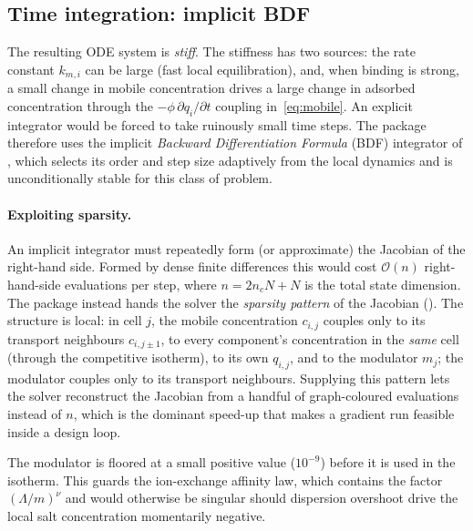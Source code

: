 \subsection{Time integration: implicit BDF}

The resulting ODE system is \emph{stiff}. The stiffness has two sources: the
rate constant $k_{m,i}$ can be large (fast local equilibration), and, when
binding is strong, a small change in mobile concentration drives a large change
in adsorbed concentration through the $-\phi\,\partial q_i/\partial t$ coupling
in~\eqref{eq:mobile}. An explicit integrator would be forced to take
ruinously small time steps. The package therefore uses the implicit
\emph{Backward Differentiation Formula} (BDF) integrator of
, which selects its order and step size
adaptively from the local dynamics and is unconditionally stable for this class
of problem.

\paragraph{Exploiting sparsity.}
An implicit integrator must repeatedly form (or approximate) the Jacobian of the
right-hand side. Formed by dense finite differences this would cost $\mathcal
O(n)$ right-hand-side evaluations per step, where $n = 2 n_c N + N$ is the total
state dimension. The package instead hands the solver the \emph{sparsity
pattern} of the Jacobian (). The structure is local:
in cell $j$, the mobile concentration $c_{i,j}$ couples only to its transport
neighbours $c_{i,j\pm1}$, to every component's concentration in the
\emph{same} cell (through the competitive isotherm), to its own $q_{i,j}$, and to
the modulator $m_j$; the modulator couples only to its transport neighbours.
Supplying this pattern lets the solver reconstruct the Jacobian from a handful of
graph-coloured evaluations instead of $n$, which is the dominant speed-up that
makes a gradient run feasible inside a design loop.

\begin{remark}
The modulator is floored at a small positive value ($10^{-9}$) before it is used
in the isotherm. This guards the ion-exchange affinity law, which contains the
factor $(\Lambda/m)^{\nu}$ and would otherwise be singular should dispersion
overshoot drive the local salt concentration momentarily negative.
\end{remark}

